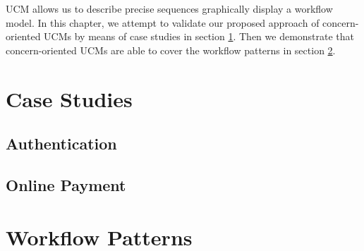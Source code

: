 UCM allows us to describe precise sequences  graphically display a workflow model. In this chapter, we attempt to validate our proposed approach of concern-oriented UCMs by means of case studies in section \ref{sec:5.1}. Then we demonstrate that concern-oriented UCMs are able to cover the workflow patterns in section \ref{sec:5.2}.


\section{Case Studies} \label{sec:5.1}

\subsection{Authentication}

\subsection{Online Payment}

\section{Workflow Patterns} \label{sec:5.2}
